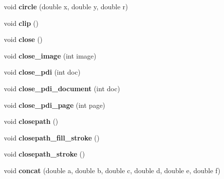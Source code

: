 \begin{DoxyCompactItemize}
\item 
\hypertarget{classPDFlib_a829708ea81ca5fdc782b41671d289024}{void {\bfseries circle} (double x, double y, double r)}\label{classPDFlib_a829708ea81ca5fdc782b41671d289024}

\item 
\hypertarget{classPDFlib_ac975ffef2d14cd63e59c2721934ccc7c}{void {\bfseries clip} ()}\label{classPDFlib_ac975ffef2d14cd63e59c2721934ccc7c}

\item 
\hypertarget{classPDFlib_ae9242dfb19f5367436a6964546d9d4e6}{void {\bfseries close} ()}\label{classPDFlib_ae9242dfb19f5367436a6964546d9d4e6}

\item 
\hypertarget{classPDFlib_ac063ee8ba65df5795c8f488a2238cf7f}{void {\bfseries close\-\_\-image} (int image)}\label{classPDFlib_ac063ee8ba65df5795c8f488a2238cf7f}

\item 
\hypertarget{classPDFlib_a8b4d6ae7f6df6ac04d54b3f1449849f1}{void {\bfseries close\-\_\-pdi} (int doc)}\label{classPDFlib_a8b4d6ae7f6df6ac04d54b3f1449849f1}

\item 
\hypertarget{classPDFlib_aefcbc8ddb1ef96388f6f2c61f7e05d7e}{void {\bfseries close\-\_\-pdi\-\_\-document} (int doc)}\label{classPDFlib_aefcbc8ddb1ef96388f6f2c61f7e05d7e}

\item 
\hypertarget{classPDFlib_abba8fa8b8ef399bcb6d57b40bd83a5ee}{void {\bfseries close\-\_\-pdi\-\_\-page} (int page)}\label{classPDFlib_abba8fa8b8ef399bcb6d57b40bd83a5ee}

\item 
\hypertarget{classPDFlib_a75f331c8e3dda754cfc4acd372366917}{void {\bfseries closepath} ()}\label{classPDFlib_a75f331c8e3dda754cfc4acd372366917}

\item 
\hypertarget{classPDFlib_a8d3d85a5f00e71fa3127cc42ac5245a1}{void {\bfseries closepath\-\_\-fill\-\_\-stroke} ()}\label{classPDFlib_a8d3d85a5f00e71fa3127cc42ac5245a1}

\item 
\hypertarget{classPDFlib_a926f4d493d0625eec0a5638a1318c661}{void {\bfseries closepath\-\_\-stroke} ()}\label{classPDFlib_a926f4d493d0625eec0a5638a1318c661}

\item 
\hypertarget{classPDFlib_aad54672cea67b8d25f68ae735cf1f4ca}{void {\bfseries concat} (double a, double b, double c, double d, double e, double f)}\label{classPDFlib_aad54672cea67b8d25f68ae735cf1f4ca}


\end{DoxyCompactItemize}

